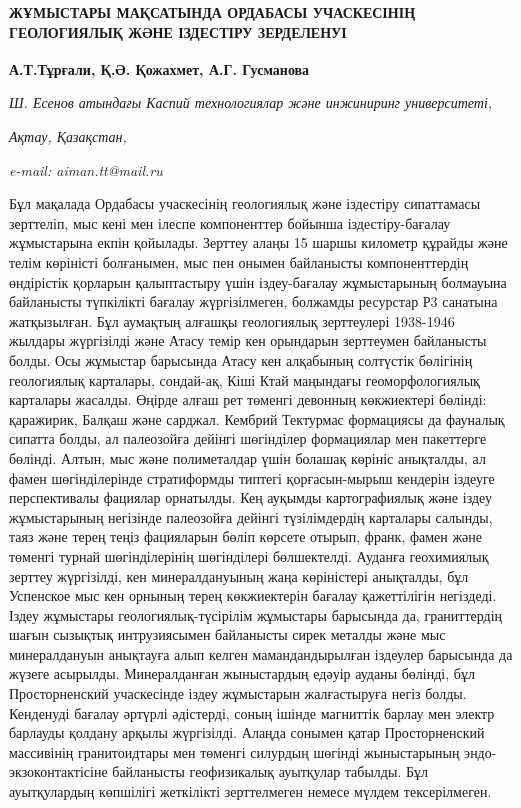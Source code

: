 {\bfseries ЖҰМЫСТАРЫ МАҚСАТЫНДА ОРДАБАСЫ УЧАСКЕСІНІҢ ГЕОЛОГИЯЛЫҚ ЖӘНЕ
ІЗДЕСТІРУ ЗЕРДЕЛЕНУІ}

{\bfseries А.Т.Тұрғали\textsuperscript{\envelope }, Қ.Ә. Қожахмет, А.Г. Гусманова}

\emph{Ш. Есенов атындағы Каспий технологиялар және инжиниринг
университеті,}

\emph{Ақтау, Қазақстан,}

\emph{e-mail: aiman.tt@mail.ru}

Бұл мақалада Ордабасы учаскесінің геологиялық және іздестіру сипаттамасы
зерттеліп, мыс кені мен ілеспе компоненттер бойынша іздестіру-бағалау
жұмыстарына екпін қойылады. Зерттеу алаңы 15 шаршы километр құрайды және
телім көріністі болғанымен, мыс пен онымен байланысты компоненттердің
өндірістік қорларын қалыптастыру үшін іздеу-бағалау жұмыстарының
болмауына байланысты түпкілікті бағалау жүргізілмеген, болжамды
ресурстар Р3 санатына жатқызылған. Бұл аумақтың алғашқы геологиялық
зерттеулері 1938-1946 жылдары жүргізілді және Атасу темір кен орындарын
зерттеумен байланысты болды. Осы жұмыстар барысында Атасу кен алқабының
солтүстік бөлігінің геологиялық карталары, сондай-ақ, Кіші Ктай
маңындағы геоморфологиялық карталары жасалды. Өңірде алғаш рет төменгі
девонның көкжиектері бөлінді: қаражирик, Балқаш және сарджал. Кембрий
Тектурмас формациясы да фауналық сипатта болды, ал палеозойға дейінгі
шөгінділер формациялар мен пакеттерге бөлінді. Алтын, мыс және
полиметалдар үшін болашақ көрініс анықталды, ал фамен шөгінділерінде
стратиформды типтегі қорғасын-мырыш кендерін іздеуге перспективалы
фациялар орнатылды. Кең ауқымды картографиялық және іздеу жұмыстарының
негізінде палеозойға дейінгі түзілімдердің карталары салынды, таяз және
терең теңіз фацияларын бөліп көрсете отырып, франк, фамен және төменгі
турнай шөгінділерінің шөгінділері бөлшектелді. Ауданға геохимиялық
зерттеу жүргізілді, кен минералдануының жаңа көріністері анықталды, бұл
Успенское мыс кен орнының терең көкжиектерін бағалау қажеттілігін
негіздеді. Іздеу жұмыстары геологиялық-түсірілім жұмыстары барысында да,
граниттердің шағын сызықтық интрузиясымен байланысты сирек металды және
мыс минералдануын анықтауға алып келген мамандандырылған іздеулер
барысында да жүзеге асырылды. Минералданған жыныстардың едәуір ауданы
бөлінді, бұл Просторненский учаскесінде іздеу жұмыстарын жалғастыруға
негіз болды. Кенденуді бағалау әртүрлі әдістерді, соның ішінде магниттік
барлау мен электр барлауды қолдану арқылы жүргізілді. Алаңда сонымен
қатар Просторненский массивінің гранитоидтары мен төменгі силурдың
шөгінді жыныстарының эндо-экзоконтактісіне байланысты геофизикалық
ауытқулар табылды. Бұл ауытқулардың көпшілігі жеткілікті зерттелмеген
немесе мүлдем тексерілмеген.

